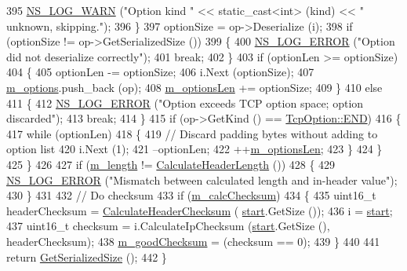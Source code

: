 \begin{DoxyCode}
395           \hyperlink{group__logging_gade7208b4009cdf0e25783cd26766f559}{NS\_LOG\_WARN} (\textcolor{stringliteral}{"Option kind "} << static\_cast<int> (kind) << \textcolor{stringliteral}{" unknown, skipping."});
396         \}
397       optionSize = op->Deserialize (i);
398       \textcolor{keywordflow}{if} (optionSize != op->GetSerializedSize ())
399         \{
400           \hyperlink{group__logging_ga0261a8db1d4ac5f79417d117634fd455}{NS\_LOG\_ERROR} (\textcolor{stringliteral}{"Option did not deserialize correctly"});
401           \textcolor{keywordflow}{break};
402         \}
403       \textcolor{keywordflow}{if} (optionLen >= optionSize)
404         \{
405           optionLen -= optionSize;
406           i.Next (optionSize);
407           \hyperlink{classns3_1_1TcpHeader_af0a6b523e1769d521e2a90caa1c8b4d2}{m\_options}.push\_back (op);
408           \hyperlink{classns3_1_1TcpHeader_a36cbd14a45d74bfd2645f6a2f6772c7d}{m\_optionsLen} += optionSize;
409         \}
410       \textcolor{keywordflow}{else}
411         \{
412           \hyperlink{group__logging_ga0261a8db1d4ac5f79417d117634fd455}{NS\_LOG\_ERROR} (\textcolor{stringliteral}{"Option exceeds TCP option space; option discarded"});
413           \textcolor{keywordflow}{break};
414         \}
415       \textcolor{keywordflow}{if} (op->GetKind () == \hyperlink{classns3_1_1TcpOption_ab5fef728704d0ef8415899ca6af3efdda905203642bcd2c4a51a9dc346cd295a9}{TcpOption::END})
416         \{
417           \textcolor{keywordflow}{while} (optionLen)
418             \{
419               \textcolor{comment}{// Discard padding bytes without adding to option list}
420               i.Next (1);
421               --optionLen;
422               ++\hyperlink{classns3_1_1TcpHeader_a36cbd14a45d74bfd2645f6a2f6772c7d}{m\_optionsLen};
423             \}
424         \}
425     \}
426 
427   \textcolor{keywordflow}{if} (\hyperlink{classns3_1_1TcpHeader_a501531d63af9e3950e137df87fc054da}{m\_length} != \hyperlink{classns3_1_1TcpHeader_a8e952fc624e3e2fcbcfc8f94cc396ecf}{CalculateHeaderLength} ())
428     \{
429       \hyperlink{group__logging_ga0261a8db1d4ac5f79417d117634fd455}{NS\_LOG\_ERROR} (\textcolor{stringliteral}{"Mismatch between calculated length and in-header value"});
430     \}
431 
432   \textcolor{comment}{// Do checksum}
433   \textcolor{keywordflow}{if} (\hyperlink{classns3_1_1TcpHeader_a75e3fab988b34ad7406eff0134c1777c}{m\_calcChecksum})
434     \{
435       uint16\_t headerChecksum = \hyperlink{classns3_1_1TcpHeader_ae1e83c9fd04d4eb45374c1b9a8425b50}{CalculateHeaderChecksum} (
      \hyperlink{namespacevisualizer_1_1core_a2a35e5d8a34af358b508dac8635754e0}{start}.GetSize ());
436       i = \hyperlink{namespacevisualizer_1_1core_a2a35e5d8a34af358b508dac8635754e0}{start};
437       uint16\_t checksum = i.CalculateIpChecksum (\hyperlink{namespacevisualizer_1_1core_a2a35e5d8a34af358b508dac8635754e0}{start}.GetSize (), headerChecksum);
438       \hyperlink{classns3_1_1TcpHeader_abff3dc7bf583a246c51ffcd2055ff059}{m\_goodChecksum} = (checksum == 0);
439     \}
440 
441   \textcolor{keywordflow}{return} \hyperlink{classns3_1_1TcpHeader_a1cbb8a10b7838d428f2e94806d3ce807}{GetSerializedSize} ();
442 \}
\end{DoxyCode}


